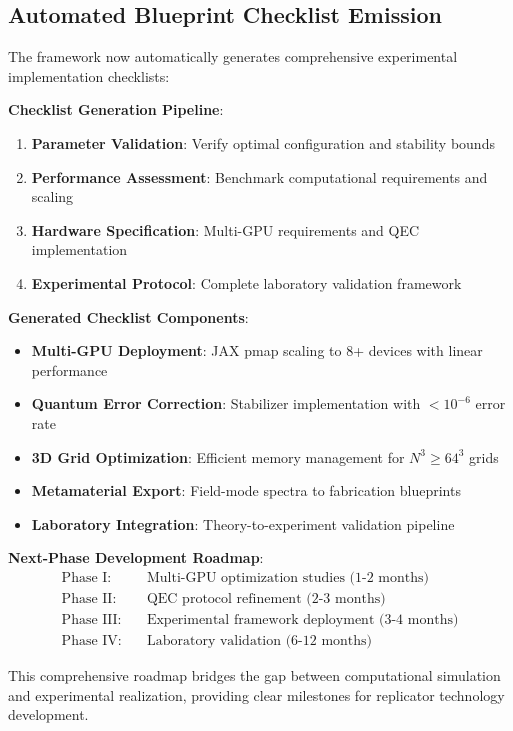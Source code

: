 \documentclass[11pt]{article}
\begin{document}
\subsection{Automated Blueprint Checklist Emission}

The framework now automatically generates comprehensive experimental implementation checklists:

\textbf{Checklist Generation Pipeline}:
\begin{enumerate}
\item \textbf{Parameter Validation}: Verify optimal configuration and stability bounds
\item \textbf{Performance Assessment}: Benchmark computational requirements and scaling
\item \textbf{Hardware Specification}: Multi-GPU requirements and QEC implementation
\item \textbf{Experimental Protocol}: Complete laboratory validation framework
\end{enumerate}

\textbf{Generated Checklist Components}:
\begin{itemize}
\item \textbf{Multi-GPU Deployment}: JAX pmap scaling to 8+ devices with linear performance
\item \textbf{Quantum Error Correction}: Stabilizer implementation with $< 10^{-6}$ error rate
\item \textbf{3D Grid Optimization}: Efficient memory management for $N^3 \geq 64^3$ grids
\item \textbf{Metamaterial Export}: Field-mode spectra to fabrication blueprints
\item \textbf{Laboratory Integration}: Theory-to-experiment validation pipeline
\end{itemize}

\textbf{Next-Phase Development Roadmap}:
\begin{align}
\text{Phase I:} &\quad \text{Multi-GPU optimization studies (1-2 months)} \\
\text{Phase II:} &\quad \text{QEC protocol refinement (2-3 months)} \\
\text{Phase III:} &\quad \text{Experimental framework deployment (3-4 months)} \\
\text{Phase IV:} &\quad \text{Laboratory validation (6-12 months)}
\end{align}

This comprehensive roadmap bridges the gap between computational simulation and experimental realization, providing clear milestones for replicator technology development.
\end{document}
